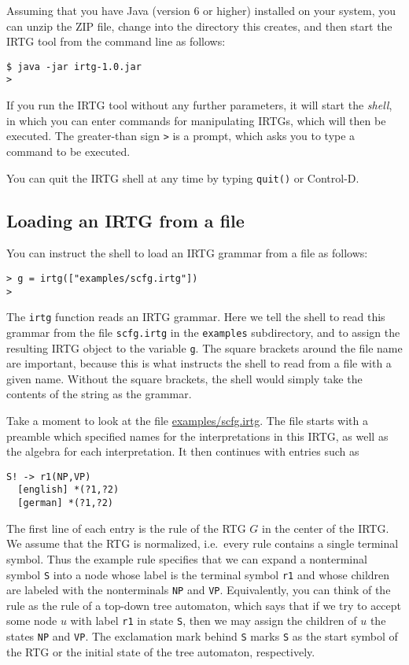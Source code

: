 \documentclass[11pt]{article}
\begin{document}
Assuming that you have Java (version 6 or higher) installed on your
system, you can unzip the ZIP file, change into the directory this
creates, and then start the IRTG tool from the command line as
follows:

\begin{verbatim}
$ java -jar irtg-1.0.jar
>
\end{verbatim}

If you run the IRTG tool without any further parameters, it will
start the \emph{shell}, in which you can enter commands for
manipulating IRTGs, which will then be executed. The greater-than sign
\verb?>? is a prompt, which asks you to type a command to be
executed.

You can quit the IRTG shell at any time by typing \verb?quit()? or
Control-D.



\subsection{Loading an IRTG from a file}

You can instruct the shell to load an IRTG grammar from a file as
follows:

\begin{verbatim}
> g = irtg(["examples/scfg.irtg"])
>
\end{verbatim}

The \verb?irtg? function reads an IRTG grammar. Here we tell the shell
to read this grammar from the file \verb?scfg.irtg? in the
\verb?examples? subdirectory, and to assign the resulting IRTG object
to the variable \verb?g?. The square brackets around the file name are
important, because this is what instructs the shell to read from a
file with a given name. Without the square brackets, the shell would
simply take the contents of the string as the grammar.

Take a moment to look at the file \url{examples/scfg.irtg}. The file
starts with a preamble which specified names for the interpretations
in this IRTG, as well as the algebra for each interpretation. It then
continues with entries such as

\begin{verbatim}
S! -> r1(NP,VP)
  [english] *(?1,?2)
  [german] *(?1,?2)
\end{verbatim}

The first line of each entry is the rule of the RTG $G$ in the center of
the IRTG.  We assume that the RTG is normalized, i.e.\ every rule
contains a single terminal symbol.  Thus the example rule specifies
that we can expand a nonterminal symbol \verb?S? into a node whose
label is the terminal symbol \verb?r1? and whose children are labeled
with the nonterminals \verb?NP? and \verb?VP?.  Equivalently, you can
think of the rule as the rule of a top-down tree automaton, which says
that if we try to accept some node $u$ with label \verb?r1? in state
\verb?S?, then we may assign the children of $u$ the states \verb?NP?
and \verb?VP?.  The exclamation mark behind \verb?S? marks \verb?S? as
the start symbol of the RTG or the initial state of the tree
automaton, respectively.
\end{document}
